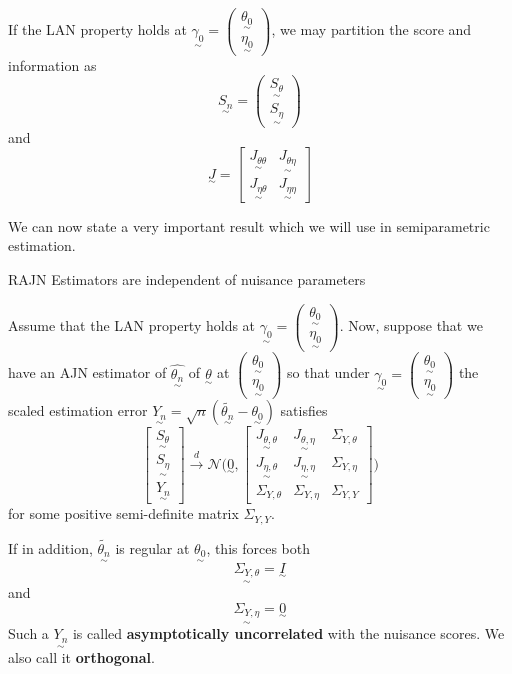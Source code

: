 \documentclass[twoside]{article}
\newcommand{\utilde}{\underset{\sim}}
\begin{document}
If the LAN property holds at $\utilde{\gamma_{0}} = \begin{pmatrix}\utilde{\theta_{0}} \\ \utilde{\eta_{0}}\end{pmatrix}$, we may partition the score and information as 
$$
\utilde{S_{n}} = 
\begin{pmatrix}
\utilde{S_{\theta}}\\
\utilde{S_{\eta}}
\end{pmatrix}
$$
and 
$$
\utilde{J} = 
\begin{bmatrix}
\utilde{J_{\theta \theta}} & \utilde{J_{\theta \eta}}\\
\utilde{J_{\eta \theta}} & \utilde{J_{\eta \eta}}
\end{bmatrix}
$$

We can now state a very important result which we will use in semiparametric estimation.

\begin{proposition_exam}{RAJN Estimators are independent of nuisance parameters}{}

Assume that the LAN property holds at $\utilde{\gamma_{0}} = \begin{pmatrix}\utilde{\theta_{0}} \\ \utilde{\eta_{0}}\end{pmatrix}$. Now, suppose that we have an AJN estimator of $\hat{\utilde{\theta_{n}}}$ of $\utilde{\theta}$ at 
$
\begin{pmatrix}
\utilde{\theta_{0}}\\
\utilde{\eta_{0}}
\end{pmatrix}
$
so that under 
$
\utilde{\gamma_{0}} = 
\begin{pmatrix}
\utilde{\theta_{0}}\\
\utilde{\eta_{0}}
\end{pmatrix}
$
the scaled estimation error $\utilde{Y_{n}} = \sqrt{n}(\tilde{\utilde{\theta_{n}}} - \utilde{\theta_{0}})$ satisfies 
$$
\begin{bmatrix}
\utilde{S_{\theta}}\\
\utilde{S_{\eta}}\\
\utilde{Y_{n}}
\end{bmatrix}
\xrightarrow{d}
 \mathcal{N} 
 \bigg( \utilde{0},
 \begin{bmatrix}
 \utilde{J_{\theta, \theta}} & \utilde{J_{\theta, \eta}} & \Sigma_{Y, \theta}\\
 \utilde{J_{\eta, \theta}} & \utilde{J_{\eta, \eta}} & \Sigma_{Y, \eta}\\
 \Sigma_{Y, \theta} & \Sigma_{Y, \eta} & \Sigma_{Y, Y}
 \end{bmatrix}
 \bigg)
$$
for some positive semi-definite matrix $\Sigma_{Y,Y}.$

If in addition, $\tilde{\utilde{\theta_{n}}}$ is regular at $\utilde{\theta_{0}}$, this forces both 
$$
\utilde{\Sigma_{Y, \theta}} = \utilde{I}
$$
and 
$$
\utilde{\Sigma_{Y, \eta}} = \utilde{0}
$$
Such a $\utilde{Y_{n}}$ is called \textbf{asymptotically uncorrelated} with the nuisance scores. We also call it \textbf{orthogonal}. 
\end{proposition_exam}
\end{document}
